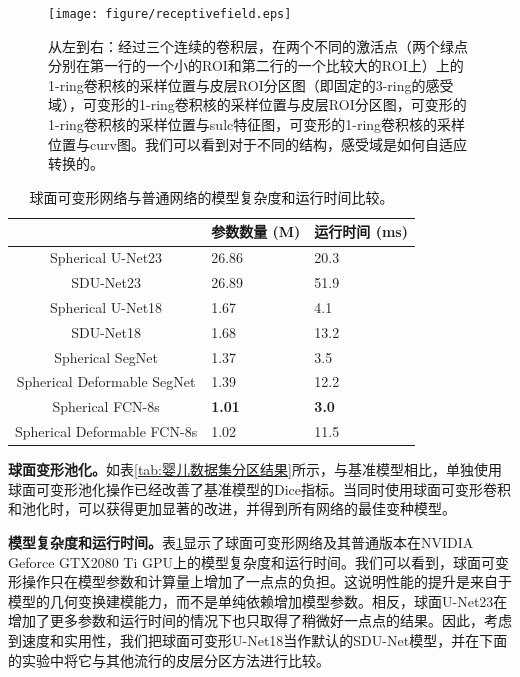 \begin{figure}[t]
	\centering
	\texttt{[image: figure/receptivefield.eps]}
	\caption{从左到右：经过三个连续的卷积层，在两个不同的激活点（两个绿点分别在第一行的一个小的ROI和第二行的一个比较大的ROI上）上的1-ring卷积核的采样位置与皮层ROI分区图（即固定的3-ring的感受域），可变形的1-ring卷积核的采样位置与皮层ROI分区图，可变形的1-ring卷积核的采样位置与sulc特征图，可变形的1-ring卷积核的采样位置与curv图。我们可以看到对于不同的结构，感受域是如何自适应转换的。}
	\label{fig:receptivefield_sampling_points}
\end{figure}

\begin{table}[h]
		\caption{\label{tab:模型复杂度和运行时间结果}球面可变形网络与普通网络的模型复杂度和运行时间比较。}
		\centering
		\begin{tabularx}{0.85\linewidth}{c|X<{\centering}|X<{\centering}}
			\hline
			& 参数数量 (M)           & 运行时间 (ms)         \\
			\hline
			Spherical U-Net23                & 26.86      &    20.3 \\
			SDU-Net23    &  	26.89           		&   51.9   \\   
			\hline
			Spherical U-Net18               & 1.67                  	&	4.1	 \\
			SDU-Net18   &	1.68	                &	13.2	  \\
			\hline
			Spherical SegNet                 & 	1.37                    &			3.5 \\
			Spherical Deformable SegNet    &			1.39            &  	 12.2	 \\
			\hline
			Spherical FCN-8s                 &  		\textbf{1.01}                &	\textbf{3.0}	 \\
			Spherical Deformable FCN-8s   & 	1.02                    &11.5  \\
			\hline 
		\end{tabularx}
\end{table}

\textbf{球面变形池化。}如表\ref{tab:婴儿数据集分区结果}所示，与基准模型相比，单独使用球面可变形池化操作已经改善了基准模型的Dice指标。当同时使用球面可变形卷积和池化时，可以获得更加显著的改进，并得到所有网络的最佳变种模型。

\textbf{模型复杂度和运行时间。}表\ref{tab:模型复杂度和运行时间结果}显示了球面可变形网络及其普通版本在NVIDIA Geforce GTX2080 Ti GPU上的模型复杂度和运行时间。我们可以看到，球面可变形操作只在模型参数和计算量上增加了一点点的负担。这说明性能的提升是来自于模型的几何变换建模能力，而不是单纯依赖增加模型参数。相反，球面U-Net23在增加了更多参数和运行时间的情况下也只取得了稍微好一点点的结果。因此，考虑到速度和实用性，我们把球面可变形U-Net18当作默认的SDU-Net模型，并在下面的实验中将它与其他流行的皮层分区方法进行比较。

